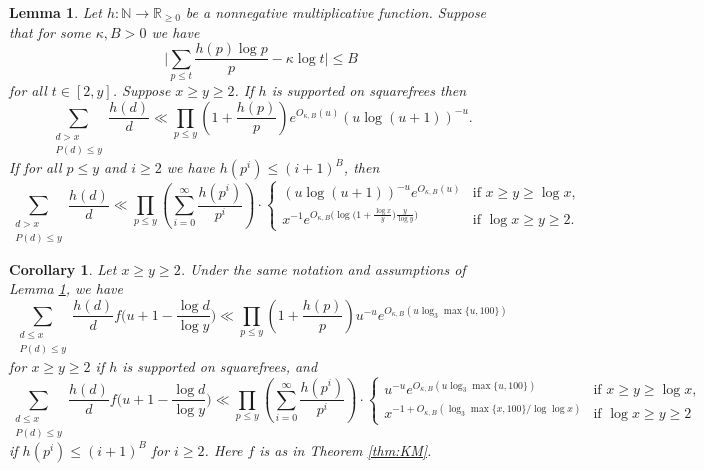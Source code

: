 \documentclass[10pt,a4paper]{amsart}
\newtheorem{lem}{Lemma}
\newtheorem{cor}{Corollary}
\newcommand{\NN}{\mathbb{N}}
\newcommand{\RR}{\mathbb{R}}
\begin{document}
\begin{lem}\label{lem:rankin}
Let $h\colon \NN\to \RR_{\ge 0}$ be a nonnegative multiplicative function. Suppose that for some $\kappa,B> 0$ we have
	\begin{equation}\label{eq:mertensk}
		\bigg|\sum_{p\le t} \frac{h(p)\log p}{p}-\kappa \log t\bigg|\le B
	\end{equation}
	for all $t \in [2,y]$. Suppose $x\ge y \ge 2$. If $h$ is supported on squarefrees then
	\[ \sum_{\substack{d>x\\ P(d)\le y}} \frac{h(d)}{d} \ll \prod_{p\le y}\left(1+\frac{h(p)}{p}\right) e^{O_{\kappa,B}(u)}  (u\log (u+1))^{-u}. \]
	If for all $p\le y$ and $i\ge 2$ we have $h(p^i)\le (i+1)^B$, then
	\[ \sum_{\substack{d>x\\ P(d)\le y}} \frac{h(d)}{d} \ll  \prod_{p\le y}\left(\sum_{i=0}^{\infty}\frac{h(p^i)}{p^i}\right)\cdot  \begin{cases}  (u\log (u+1))^{-u}e^{O_{\kappa,B}(u)} &\text{if }x\ge y \ge \log x,\\ x^{-1} e^{O_{\kappa,B}\big(\log \big(1+\tfrac{\log x}{y}\big)\tfrac{y}{\log y}\big)} &\text{if }\log x \ge y \ge 2.\end{cases}\]
\end{lem}

\begin{cor}\label{cor:rankin}
	Let $x\ge y\ge 2$. Under the same notation and assumptions of Lemma \ref{lem:rankin}, we have
	\[ \sum_{\substack{d\le x\\ P(d)\le y}} \frac{h(d)}{d}f\big( u+1 - \frac{\log d}{\log y}\big)\ll \prod_{p\le y}\left(1+\frac{h(p)}{p}\right) u^{-u}e^{O_{\kappa,B}(u\log_3 \max\{u,100\})}\]
for $x\ge y \ge 2$	if $h$ is supported on squarefrees, and 
	\[ \sum_{\substack{d\le x\\ P(d)\le y}} \frac{h(d)}{d}f\big( u+1 - \frac{\log d}{\log y}\big)\ll\prod_{p\le y}\left(\sum_{i=0}^{\infty}\frac{h(p^i)}{p^i}\right) \cdot \begin{cases} u^{-u}e^{O_{\kappa,B}(u\log_3 \max\{u,100\})} &\text{if }x\ge y \ge \log x, \\ x^{-1+O_{\kappa,B}(\log_3 \max\{x,100\} / \log \log x)} &\text{if }\log x \ge y \ge 2\end{cases}\]
	if $h(p^i)\le (i+1)^B$ for $i\ge 2$. Here $f$ is as in Theorem \ref{thm:KM}.
\end{cor}
\end{document}

